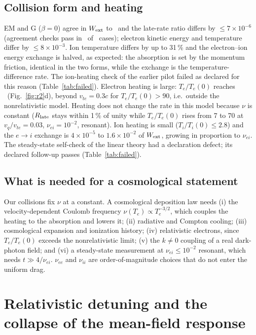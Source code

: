 \documentclass[aps,pre,reprint,floatfix,amsmath,amssymb,nofootinbib,superscriptaddress]{revtex4-2}
\newcommand{\vq}{v_q/v_{te}}
\newcommand{\Wext}{W_{\rm ext}}
\begin{document}
\subsection{Collision form and heating}
EM and G ($\beta=0$) agree in $\Wext$ to \rtwoCVwx\ and the late-rate ratio differs by $\le7\times10^{-6}$ (agreement checks pass in \rtwoCV\ of \rtwoCVN\ cases); electron kinetic energy and temperature differ by $\le8\times10^{-3}$. Ion temperature differs by up to 31\,\% and the electron--ion energy exchange is halved, as expected: the absorption is set by the momentum friction, identical in the two forms, while the exchange is the temperature-difference rate. The ion-heating check of the earlier pilot failed as declared for this reason (Table~\ref{tab:failed}). Electron heating is large: $T_e/T_e(0)$ reaches \rtwoTmax\ (Fig.~\ref{fig:r2}d), beyond $v_{te}=0.3c$ for $T_e/T_e(0)>90$, i.e.\ outside the nonrelativistic model. Heating does not change the rate in this model because $\nu$ is constant ($R_{\rm late}$ stays within 1\,\% of unity while $T_e/T_e(0)$ rises from 7 to 70 at $\vq=0.03$, $\nu_{ei}=10^{-2}$, resonant). Ion heating is small ($T_i/T_i(0)\le2.8$) and the $e\to i$ exchange is $4\times10^{-5}$ to $1.6\times10^{-2}$ of $\Wext$, growing in proportion to $\nu_{ei}$. The steady-state self-check of the linear theory had a declaration defect; its declared follow-up passes (Table~\ref{tab:failed}).

\subsection{What is needed for a cosmological statement}
Our collisions fix $\nu$ at a constant. A cosmological deposition law needs (i) the velocity-dependent Coulomb frequency $\nu(T_e)\propto T_e^{-3/2}$, which couples the heating to the absorption and lowers it; (ii) radiative and Compton cooling; (iii) cosmological expansion and ionization history; (iv) relativistic electrons, since $T_e/T_e(0)$ exceeds the nonrelativistic limit; (v) the $k\ne0$ coupling of a real dark-photon field; and (vi) a steady-state measurement at $\nu_{ei}\le10^{-2}$ resonant, which needs $t\gg4/\nu_{ei}$. $\nu_{ee}$ and $\nu_{ii}$ are order-of-magnitude choices that do not enter the uniform drag.


\section{Relativistic detuning and the collapse of the mean-field response}\label{sec:rel}
\end{document}
